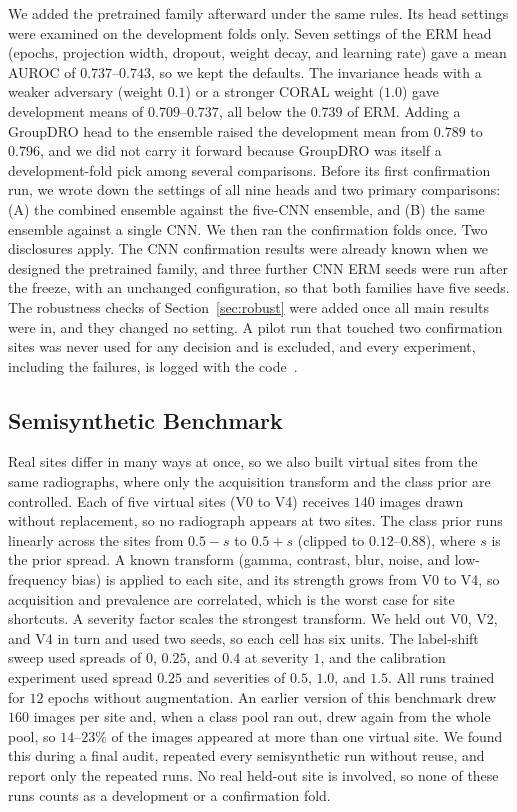 \documentclass[journal]{IEEEtran}
\newcommand{\erm}{ERM}
\begin{document}
We added the pretrained family afterward under the same rules. Its head settings were examined on the development folds only. Seven settings of the ERM head (epochs, projection width, dropout, weight decay, and learning rate) gave a mean AUROC of $0.737$--$0.743$, so we kept the defaults. The invariance heads with a weaker adversary (weight $0.1$) or a stronger CORAL weight ($1.0$) gave development means of $0.709$--$0.737$, all below the $0.739$ of ERM. Adding a GroupDRO head to the ensemble raised the development mean from $0.789$ to $0.796$, and we did not carry it forward because GroupDRO was itself a development-fold pick among several comparisons. Before its first confirmation run, we wrote down the settings of all nine heads and two primary comparisons: (A) the combined ensemble against the five-CNN ensemble, and (B) the same ensemble against a single CNN. We then ran the confirmation folds once. Two disclosures apply. The CNN confirmation results were already known when we designed the pretrained family, and three further CNN \erm{} seeds were run after the freeze, with an unchanged configuration, so that both families have five seeds. The robustness checks of Section~\ref{sec:robust} were added once all main results were in, and they changed no setting. A pilot run that touched two confirmation sites was never used for any decision and is excluded, and every experiment, including the failures, is logged with the code~\cite{rao2026sidlcode}.

\subsection{Semisynthetic Benchmark}\label{sec:synth}
Real sites differ in many ways at once, so we also built virtual sites from the same radiographs, where only the acquisition transform and the class prior are controlled. Each of five virtual sites (V0 to V4) receives $140$ images drawn without replacement, so no radiograph appears at two sites. The class prior runs linearly across the sites from $0.5-s$ to $0.5+s$ (clipped to $0.12$--$0.88$), where $s$ is the prior spread. A known transform (gamma, contrast, blur, noise, and low-frequency bias) is applied to each site, and its strength grows from V0 to V4, so acquisition and prevalence are correlated, which is the worst case for site shortcuts. A severity factor scales the strongest transform. We held out V0, V2, and V4 in turn and used two seeds, so each cell has six units. The label-shift sweep used spreads of $0$, $0.25$, and $0.4$ at severity $1$, and the calibration experiment used spread $0.25$ and severities of $0.5$, $1.0$, and $1.5$. All runs trained for $12$ epochs without augmentation. An earlier version of this benchmark drew $160$ images per site and, when a class pool ran out, drew again from the whole pool, so $14$--$23\%$ of the images appeared at more than one virtual site. We found this during a final audit, repeated every semisynthetic run without reuse, and report only the repeated runs. No real held-out site is involved, so none of these runs counts as a development or a confirmation fold.
\end{document}
